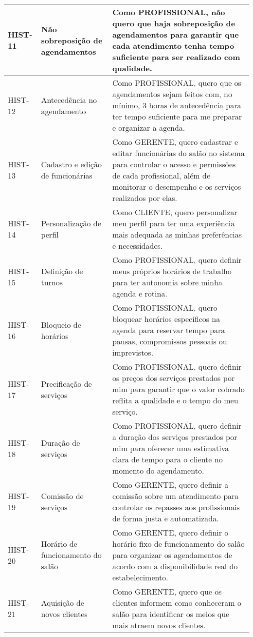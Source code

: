 \begin{longtable}{|p{2cm}|p{4cm}|p{9cm}|}
	HIST-11 & Não sobreposição de agendamentos & Como PROFISSIONAL, não quero que haja sobreposição de agendamentos para garantir que cada atendimento tenha tempo suficiente para ser realizado com qualidade. \\ \hline
	HIST-12 & Antecedência no agendamento & Como PROFISSIONAL, quero que os agendamentos sejam feitos com, no mínimo, 3 horas de antecedência para ter tempo suficiente para me preparar e organizar a agenda. \\ \hline
	HIST-13 & Cadastro e edição de funcionárias & Como GERENTE, quero cadastrar e editar funcionárias do salão no sistema para controlar o acesso e permissões de cada profissional, além de monitorar o desempenho e os serviços realizados por elas. \\ \hline
	HIST-14 & Personalização de perfil & Como CLIENTE, quero personalizar meu perfil para ter uma experiência mais adequada as minhas preferências e necessidades. \\ \hline
	HIST-15 & Definição de turnos & Como PROFISSIONAL, quero definir meus próprios horários de trabalho para ter autonomia sobre minha agenda e rotina. \\ \hline
	HIST-16 & Bloqueio de horários & Como PROFISSIONAL, quero bloquear horários específicos na agenda para reservar tempo para pausas, compromissos pessoais ou imprevistos. \\ \hline
	HIST-17 & Precificação de serviços & Como PROFISSIONAL, quero definir os preços dos serviços prestados por mim para garantir que o valor cobrado reflita a qualidade e o tempo do meu serviço. \\ \hline
	HIST-18 & Duração de serviços & Como PROFISSIONAL, quero definir a duração dos serviços prestados por mim para oferecer uma estimativa clara de tempo para o cliente no momento do agendamento. \\ \hline
	HIST-19 & Comissão de serviços & Como GERENTE, quero definir a comissão sobre um atendimento para controlar os repasses aos profissionais de forma justa e automatizada. \\ \hline
	HIST-20 & Horário de funcionamento do salão & Como GERENTE, quero definir o horário fixo de funcionamento do salão para organizar os agendamentos de acordo com a disponibilidade real do estabelecimento. \\ \hline
	HIST-21 & Aquisição de novos clientes & Como GERENTE, quero que os clientes informem como conheceram o salão para identificar os meios que mais atraem novos clientes. \\ \hline

\end{longtable}
